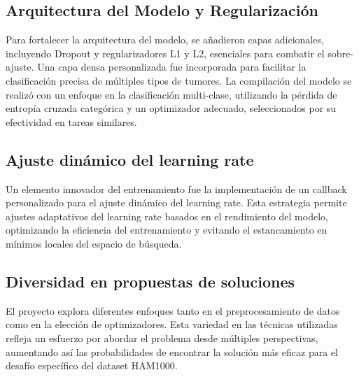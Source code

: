 \subsection{Arquitectura del Modelo y Regularización}
Para fortalecer la arquitectura del modelo, se añadieron capas adicionales, incluyendo Dropout y regularizadores L1 y L2, esenciales para combatir el sobre-ajuste. Una capa densa personalizada fue incorporada para facilitar la clasificación precisa de múltiples tipos de tumores. La compilación del modelo se realizó con un enfoque en la clasificación multi-clase, utilizando la pérdida de entropía cruzada categórica y un optimizador adecuado, seleccionados por su efectividad en tareas similares.

\subsection{Ajuste dinámico del learning rate}
Un elemento innovador del entrenamiento fue la implementación de un callback personalizado para el ajuste dinámico del learning rate. Esta estrategia permite ajustes adaptativos del learning rate basados en el rendimiento del modelo, optimizando la eficiencia del entrenamiento y evitando el estancamiento en mínimos locales del espacio de búsqueda.

\subsection{Diversidad en propuestas de soluciones}
El proyecto explora diferentes enfoques tanto en el preprocesamiento de datos como en la elección de optimizadores. Esta variedad en las técnicas utilizadas refleja un esfuerzo por abordar el problema desde múltiples perspectivas, aumentando así las probabilidades de encontrar la solución más eficaz para el desafío específico del dataset HAM1000.